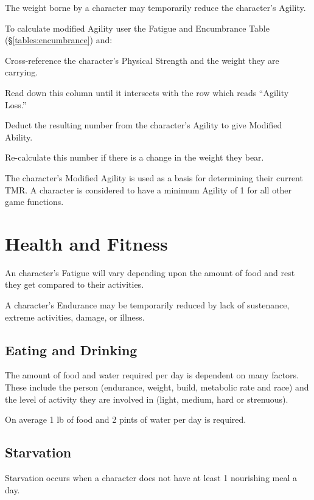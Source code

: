 \begin{multicols*}{3}
The weight borne by a character may temporarily reduce the character's
Agility.

To calculate modified Agility user the Fatigue and Encumbrance Table
(\S\ref{tables:encumbrance}) and:
\begin{Enumerate}
\item
Cross-reference the character's Physical Strength and the weight they
are carrying.

\item
Read down this column until it intersects with the row which reads
``Agility Loss.''

\item
Deduct the resulting number from the character's Agility to give
Modified Ability.

\item
Re-calculate this number if there is a change in the weight they bear.
\end{Enumerate}

The character's Modified Agility is used as a basis for determining
their current TMR. A character is considered to have a minimum Agility
of 1 for all other game functions.

\section{Health and Fitness}
\label{adventure:health}
An character's Fatigue will vary depending upon the amount of food and
rest they get compared to their activities.

A character's Endurance may be temporarily reduced by lack of
sustenance, extreme activities, damage, or illness.

\subsection{Eating and Drinking}
\label{adventure:eating}
The amount of food and water required per day is dependent on many
factors. These include the person (endurance, weight, build, metabolic
rate and race) and the level of activity they are involved in (light,
medium, hard or strenuous).

On average 1 lb of food and 2 pints of water per day is required.

\subsection{Starvation}

Starvation occurs when a character does not have at least 1 nourishing
meal a day.


\end{multicols*}
